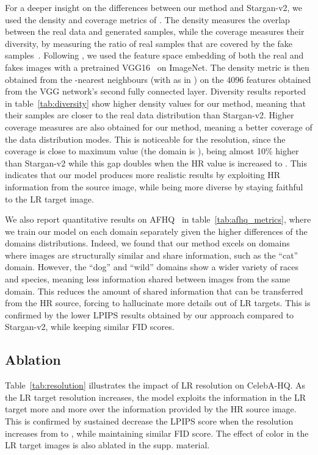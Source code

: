 For a deeper insight on the differences between our method and Stargan-v2, we used the density and coverage metrics of \cite{divCov}. The density measures the overlap between the real data and generated samples, while the coverage measures their diversity, by measuring the ratio of real samples that are covered by the fake samples~\cite{divCov}. Following \cite{divCov}, we used the feature space embedding of both the real and fakes images with a pretrained VGG16~\cite{vgg} on ImageNet. The density metric is then obtained from the -nearest neighbours (with  as in \cite{divCov}) on the 4096 features obtained from the VGG network's second fully connected layer. Diversity results reported in table~\ref{tab:diversity} show higher density values for our method, meaning that their samples are closer to the real data distribution than Stargan-v2. Higher coverage measures are also obtained for our method, meaning a better coverage of the data distribution modes. This is noticeable for the  resolution, since the coverage is close to maximum value (the domain is ), being almost 10\% higher than Stargan-v2 while this gap doubles when the HR value is increased to . This indicates that our model produces more realistic results by exploiting HR information from the source image, while being more diverse by staying faithful to the LR target image.

We also report quantitative results on AFHQ~\cite{starganv} in table~\ref{tab:afhq_metrics}, where we train our model on each domain separately given the higher differences of the domains distributions. Indeed, we found that our method excels on domains where images are structurally similar and share information, such as the ``cat'' domain. However, the ``dog'' and ``wild'' domains show a wider variety of races and species, meaning less information shared between images from the same domain. This reduces the amount of shared information that can be transferred from the HR source, forcing to hallucinate more details out of LR targets. This is confirmed by the lower LPIPS results obtained by our approach compared to Stargan-v2, while keeping similar FID scores.

\subsection{Ablation}
\label{sec:ablation}

Table~\ref{tab:resolution} illustrates the impact of LR resolution on CelebA-HQ. As the LR target resolution increases, the model exploits the information in the LR target more and more over the information provided by the HR source image. This is confirmed by sustained decrease the LPIPS score when the resolution increases from  to , while maintaining similar FID score. The effect of color in the LR target images is also ablated in the supp. material.


